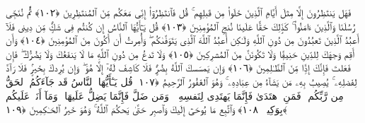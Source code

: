  فَهَل يَنتَظِرُونَ إِلَّا مِثلَ أَيَّامِ ٱلَّذِينَ خَلَوا۟ مِن قَبلِهِم ۚ قُل فَٱنتَظِرُوٓا۟ إِنِّى مَعَكُم مِّنَ ٱلمُنتَظِرِينَ ﴿١٠٢﴾
 ثُمَّ نُنَجِّى رُسُلَنَا وَٱلَّذِينَ ءَامَنُوا۟ ۚ كَذَٟلِكَ حَقًّا عَلَينَا نُنجِ ٱلمُؤمِنِينَ ﴿١٠٣﴾
 قُل يَـٰٓأَيُّهَا ٱلنَّاسُ إِن كُنتُم فِى شَكٍّۢ مِّن دِينِى فَلَآ أَعبُدُ ٱلَّذِينَ تَعبُدُونَ مِن دُونِ ٱللَّهِ وَلَـٰكِن أَعبُدُ ٱللَّهَ ٱلَّذِى يَتَوَفَّىٰكُم ۖ وَأُمِرتُ أَن أَكُونَ مِنَ ٱلمُؤمِنِينَ ﴿١٠٤﴾
 وَأَن أَقِم وَجهَكَ لِلدِّينِ حَنِيفًۭا وَلَا تَكُونَنَّ مِنَ ٱلمُشرِكِينَ ﴿١٠٥﴾
 وَلَا تَدعُ مِن دُونِ ٱللَّهِ مَا لَا يَنفَعُكَ وَلَا يَضُرُّكَ ۖ فَإِن فَعَلتَ فَإِنَّكَ إِذًۭا مِّنَ ٱلظَّـٰلِمِينَ ﴿١٠٦﴾
 وَإِن يَمسَسكَ ٱللَّهُ بِضُرٍّۢ فَلَا كَاشِفَ لَهُۥٓ إِلَّا هُوَ ۖ وَإِن يُرِدكَ بِخَيرٍۢ فَلَا رَآدَّ لِفَضلِهِۦ ۚ يُصِيبُ بِهِۦ مَن يَشَآءُ مِن عِبَادِهِۦ ۚ وَهُوَ ٱلغَفُورُ ٱلرَّحِيمُ ﴿١٠٧﴾
 قُل يَـٰٓأَيُّهَا ٱلنَّاسُ قَد جَآءَكُمُ ٱلحَقُّ مِن رَّبِّكُم ۖ فَمَنِ ٱهتَدَىٰ فَإِنَّمَا يَهتَدِى لِنَفسِهِۦ ۖ وَمَن ضَلَّ فَإِنَّمَا يَضِلُّ عَلَيهَا ۖ وَمَآ أَنَا۠ عَلَيكُم بِوَكِيلٍۢ ﴿١٠٨﴾
 وَٱتَّبِع مَا يُوحَىٰٓ إِلَيكَ وَٱصبِر حَتَّىٰ يَحكُمَ ٱللَّهُ ۚ وَهُوَ خَيرُ ٱلحَـٰكِمِينَ ﴿١٠٩﴾
 
